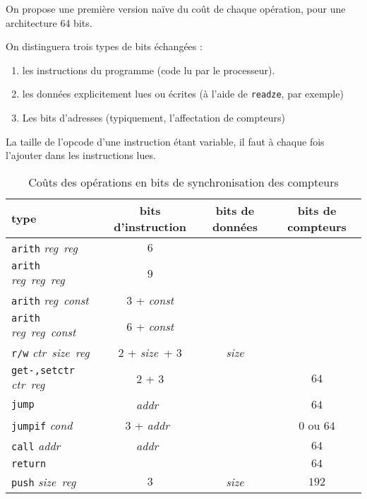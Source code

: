 \documentclass[architecture]{compas2018}
\newcommand{\reg}{\textit{reg}}
\newcommand{\const}{\textit{const}}
\newcommand{\cond}{\textit{cond}}
\newcommand{\ctr}{\textit{ctr}}
\newcommand{\size}{\textit{size}}
\newcommand{\addr}{\textit{addr}}
\begin{document}
\begin{table}[!h]
  \caption{Coûts des opérations en bits de synchronisation des compteurs}
  \label{tab:costs}


  
  On propose une première version naïve du coût de chaque opération, pour une architecture 64 bits.
  
  On distinguera trois types de bits échangées :
  \begin{enumerate}
  \item les instructions du programme (code lu par le processeur).
  \item les données explicitement lues ou écrites (à l'aide de \texttt{readze}, par exemple)
  \item Les bits d'adresses (typiquement, l'affectation de compteurs)
  \end{enumerate}
La taille de l'opcode d'une instruction étant variable, il faut à chaque fois l'ajouter dans les instructions lues.
  \begin{center}
  \begin{tabular}{|l|c|c|c|}
    \hline  
    type & bits d'instruction & bits de données & bits de compteurs \\
    \hline  
    \hline
    \texttt{arith} \reg\ \reg\ & $6$                &    &      \\
    \hline
    \texttt{arith} \reg\ \reg\ \reg\   & $9$   &    &      \\
    \hline
    \texttt{arith} \reg\ \const\       & $3$ + \const       &    &      \\
    \hline
    \texttt{arith} \reg\ \reg\ \const\ & $6$ + \const       &    &      \\
    \hline
    \texttt{r/w} \ctr\ \size\ \reg     & $2$ + \size\ + $3$ & \size           &      \\
    \hline
    \texttt{get-,setctr} \ctr\ \reg\   & $2$ + $3$          &    & $64$              \\
    \hline
    \texttt{jump}         & \addr\             &    & $64$              \\
    \hline
    \texttt{jumpif} \cond & $3$ + \addr\       &    & $0$ ou $64$       \\
    \hline
    \texttt{call} \addr   & \addr\             &    & $64$              \\
    \hline
    \texttt{return}       &       &    & $64$              \\
    \hline
    \texttt{push} \size\ \reg          & $3$   & \size           & $192$             \\
    \hline
  \end{tabular}
  \end{center}


\end{table}
\end{document}

